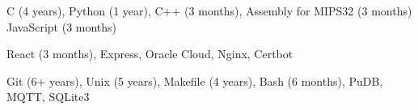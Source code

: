 
\begin{cvskills}
        {C (4 years), Python (1 year), C++ (3 months), Assembly for MIPS32 (3 months) JavaScript (3 months)} %

        {React (3 months), Express, Oracle Cloud, Nginx, Certbot} %
        
	{Git (6+ years), Unix (5 years), Makefile (4 years), Bash (6 months), PuDB, MQTT, SQLite3}
\end{cvskills}
